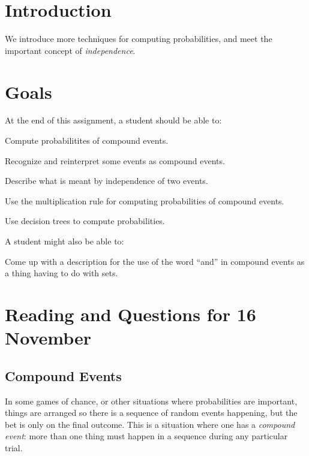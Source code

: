 \documentclass[12pt,letterpaper]{article}
\theoremstyle{definition}
\begin{document}
\setlength{\parskip}{1ex plus 0.5ex minus 0.2ex}
\setlength{\parindent}{0pt}

\pagestyle{fancy}
\cfoot{}

\section*{Introduction}
We introduce more techniques for computing probabilities, and meet the important concept of \emph{independence}.

\section*{Goals}
At the end of this assignment, a student should be able to:
\begin{compactitem}
\item Compute probabilitites of compound events.
\item Recognize and reinterpret some events as compound events.
\item Describe what is meant by independence of two events.
\item Use the multiplication rule for computing probabilities of compound events.
\item Use decision trees to compute probabilities.
\end{compactitem}
A student might also be able to:
\begin{compactitem}
\item Come up with a description for the use of the word ``and'' in compound events as a thing having to do with sets.
\end{compactitem}

\section*{Reading and Questions for 16 November}

\subsection*{Compound Events} %

In some games of chance, or other situations where probabilities are important, things are arranged so there is a sequence of random events happening, but the bet is only on the final outcome. 
This is a situation where one has a \emph{compound event}: more than one thing must happen in a sequence during any particular trial.
\end{document}
